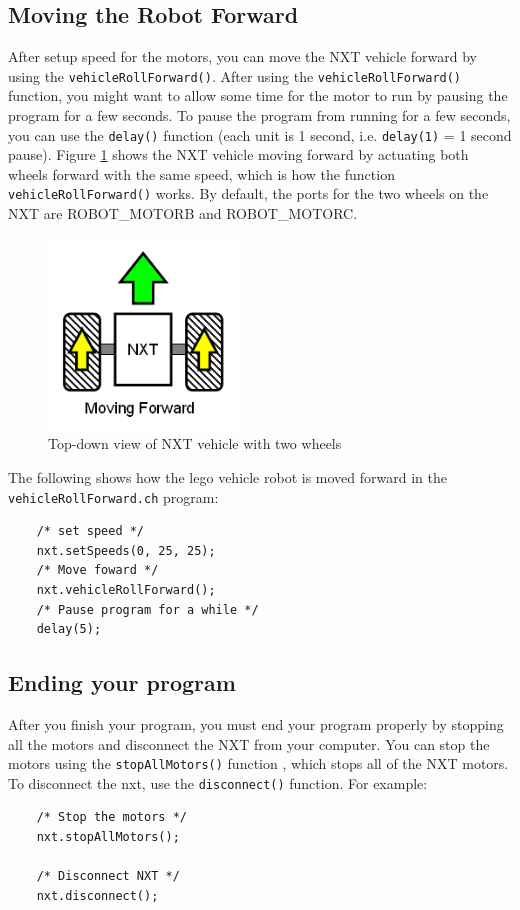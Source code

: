 \subsection{Moving the Robot Forward}
After setup speed for the motors, you can move the NXT vehicle forward by using the 
\verb+vehicleRollForward()+. After using the \verb+vehicleRollForward()+ function, you might want to 
allow some time for the motor to run by pausing the program for a few seconds. To pause the program 
from running for a few seconds, you can use the \verb+delay()+ function (each unit is 1 second, i.e. 
\verb+delay(1)+ = 1 second pause). Figure \ref{fig_NXT_forward} shows the NXT vehicle moving forward 
by actuating both wheels forward with the same speed, which is how the function \verb+vehicleRollForward()+ works. 
By default, the ports for the two wheels on the NXT are ROBOT\_MOTORB and ROBOT\_MOTORC.\\
\begin{figure}[h]
  \begin{center}
    \includegraphics[height=2in]{figure/mindstorm/Vehicle_forward.png}
    \caption{Top-down view of NXT vehicle with two wheels\label{fig_NXT_forward}}
  \end{center}
\end{figure}
\noindent
The following shows how the lego vehicle robot is moved forward in the \verb+vehicleRollForward.ch+ 
program:
\begin{verbatim}
    /* set speed */
    nxt.setSpeeds(0, 25, 25);
    /* Move foward */
    nxt.vehicleRollForward();
    /* Pause program for a while */
    delay(5);
\end{verbatim}

\subsection{Ending your program}
After you finish your program, you must end your program properly by stopping all the motors and 
disconnect the NXT from your computer. You can stop the motors using the \verb+stopAllMotors()+ function
, which stops all of the NXT motors. To disconnect the nxt, use the \verb+disconnect()+ function. For
example:
\begin{verbatim}
    /* Stop the motors */
    nxt.stopAllMotors();
    
    /* Disconnect NXT */
    nxt.disconnect();
\end{verbatim}

